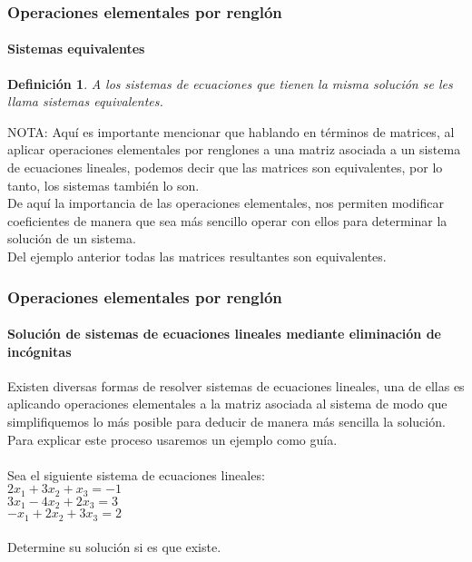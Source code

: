 \documentclass[11pt]{beamer}
\newtheorem{defi}{Definición}
\begin{document}
\begin{frame}
\frametitle{Operaciones elementales por renglón}
\framesubtitle{Sistemas equivalentes}
\begin{defi}
A los sistemas de ecuaciones que tienen la misma solución se les llama sistemas equivalentes.
\end{defi}
NOTA: Aquí es importante mencionar que hablando en términos de matrices, al aplicar operaciones elementales por renglones a una matriz asociada a un sistema de ecuaciones lineales, podemos decir que las matrices son equivalentes, por lo tanto, los sistemas también lo son.\\
De aquí la importancia de las operaciones elementales, nos permiten modificar coeficientes de manera que sea más sencillo operar con ellos para determinar la solución de un sistema.\\
Del ejemplo anterior todas las matrices resultantes son equivalentes.
\end{frame}

\begin{frame}
\frametitle{Operaciones elementales por renglón}
\framesubtitle{Solución de sistemas de ecuaciones lineales mediante eliminación de incógnitas}
Existen diversas formas de resolver sistemas de ecuaciones lineales, una de ellas es aplicando operaciones elementales a la matriz asociada al sistema de modo que simplifiquemos lo más posible para deducir de manera más sencilla la solución.
Para explicar este proceso usaremos un ejemplo como guía. \\ \hspace{0cm} \\
Sea el siguiente sistema de ecuaciones lineales: \\
$2x_1 + 3x_2 + x_3 = -1$\\
$3x_1 - 4x_2 + 2x_3 = 3$\\
$-x_1 + 2x_2 + 3x_3 = 2$\\ \hspace{0cm} \\
Determine su solución si es que existe.
\end{frame}
\end{document}
